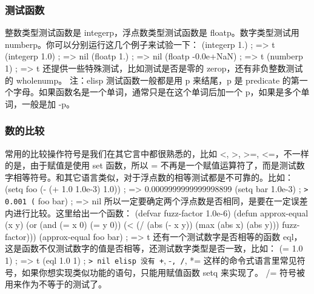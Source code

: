 \documentclass[11pt]{ctexart}
\begin{document}
\subsubsection{测试函数}
\label{sec:orgae4a1a1}
整数类型测试函数是 integerp，浮点数类型测试函数是 floatp。数字类型测试用 numberp。你可以分别运行这几个例子来试验一下：
(integerp 1.)                           ; => t
(integerp 1.0)                          ; => nil
(floatp 1.)                             ; => nil
(floatp -0.0e+NaN)                      ; => t
(numberp 1)                             ; => t
还提供一些特殊测试，比如测试是否是零的 zerop，还有非负整数测试的 wholenump。
注：elisp 测试函数一般都是用 p 来结尾，p 是 predicate 的第一个字母。如果函数名是一个单词，通常只是在这个单词后加一个 p，如果是多个单词，一般是加 -p。
\subsubsection{数的比较}
\label{sec:orgcdeca4d}
常用的比较操作符号是我们在其它言中都很熟悉的，比如 <, >, >=, <=，不一样的是，由于赋值是使用 set 函数，所以 = 不再是一个赋值运算符了，而是测试数字相等符号。和其它语言类似，对于浮点数的相等测试都是不可靠的。比如：
(setq foo (- (+ 1.0 1.0e-3) 1.0))       ; => 0.0009999999999998899
(setq bar 1.0e-3)                       ; \texttt{> 0.001
      (} foo bar)                             ; => nil
所以一定要确定两个浮点数是否相同，是要在一定误差内进行比较。这里给出一个函数：
(defvar fuzz-factor 1.0e-6)
(defun approx-equal (x y)
(or (and (= x 0) (= y 0))
(< (/ (abs (- x y))
(max (abs x) (abs y)))
fuzz-factor)))
(approx-equal foo bar)                  ; => t
还有一个测试数字是否相等的函数 eql，这是函数不仅测试数字的值是否相等，还测试数字类型是否一致，比如：
(= 1.0 1)                               ; => t
(eql 1.0 1)                             ; \texttt{> nil
      elisp 没有 +}, -\texttt{, /}, *= 这样的命令式语言里常见符号，如果你想实现类似功能的语句，只能用赋值函数 setq 来实现了。 /= 符号被用来作为不等于的测试了。
\end{document}
